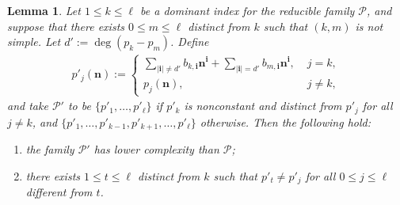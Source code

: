 \documentclass[11pt]{amsart}
\newtheorem{lemma}{Lemma}[section]
\theoremstyle{definition}
\newcommand{\CP}{{\mathcal P}}
\newcommand{\bn}{{\mathbf{n}}}
\newcommand{\1}{{\mathbf{1}}}
\newcommand{\bi}{{\textbf{i}}}
\begin{document}
\begin{lemma}\label{L: P'}
    Let $1\leq k\leq \ell$ be a dominant index for the reducible family $\CP$, and suppose that there exists $0\leq m\leq \ell$ distinct from $k$ such that $(k,m)$ is not simple. Let $d' := \deg(p_k-p_m)$. Define 
\begin{align*}
    p'_j(\bn) := \begin{cases} \sum\limits_{\vert \bi\vert\neq d'} b_{k, \bi}\bn^\bi +  \sum\limits_{\vert \bi\vert=d'} b_{m,\bi}\bn^{\bi},\; &j= k,\\
    p_j(\bn),\; &j\neq k,
\end{cases}  
\end{align*}
and take $\CP'$ to be $\{p'_1, \ldots, p'_\ell\}$ if $p'_k$ is nonconstant and distinct from $p'_j$ for all $j\neq k$, and $\{p'_1, \ldots, p'_{k-1},p'_{k+1},\ldots, p'_\ell\}$ otherwise. Then the following hold:
\begin{enumerate}
    \item the family $\CP'$ has lower complexity than $\CP$;
    \item there exists $1\leq t\leq \ell$ distinct from $k$ such that $p'_t \neq p'_j$ for all $0\leq j\leq \ell$ different from $t$.
\end{enumerate}
\end{lemma}
\end{document}
